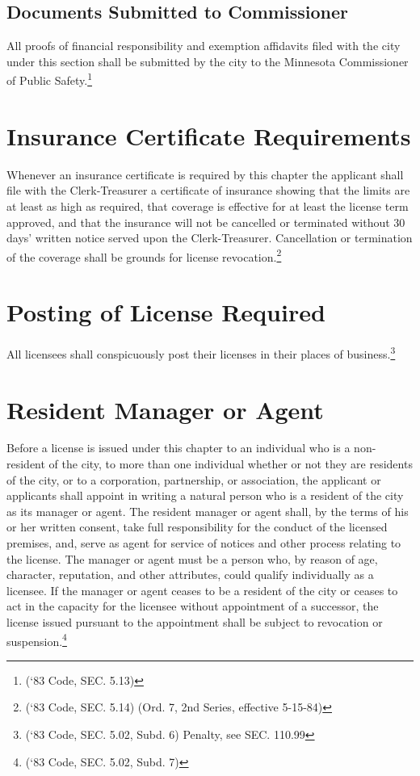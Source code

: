\subsection{Documents Submitted to Commissioner}
All proofs of financial responsibility and exemption affidavits filed with the city under this section shall be submitted by the city to the Minnesota Commissioner of Public Safety.\footnote{(‘83 Code, SEC. 5.13)}

\section{Insurance Certificate Requirements}
Whenever an insurance certificate is required by this chapter the applicant shall file with the Clerk-Treasurer a certificate of insurance showing that the limits are at least as high as required, that coverage is effective for at least the license term approved, and that the insurance will not be cancelled or terminated without 30 days’ written notice served upon the Clerk-Treasurer.  Cancellation or termination of the coverage shall be grounds for license revocation.\footnote{(‘83 Code, SEC. 5.14)  (Ord. 7, 2nd Series, effective 5-15-84)}

\section{Posting of License Required}
All licensees shall conspicuously post their licenses in their places of business.\footnote{(‘83 Code, SEC. 5.02, Subd. 6)  Penalty, see SEC. 110.99}

\section{Resident Manager or Agent}
Before a license is issued under this chapter to an individual who is a non-resident of the city, to more than one individual whether or not they are residents of the city, or to a corporation, partnership, or association, the applicant or applicants shall appoint in writing a natural person who is a resident of the city as its manager or agent.  The resident manager or agent shall, by the terms of his or her written consent, take full responsibility for the conduct of the licensed premises, and, serve as agent for service of notices and other process relating to the license.  The manager or agent must be a person who, by reason of age, character, reputation, and other attributes, could qualify individually as a licensee.  If the manager or agent ceases to be a resident of the city or ceases to act in the capacity for the licensee without appointment of a successor, the license issued pursuant to the appointment shall be subject to revocation or suspension.\footnote{(‘83 Code, SEC. 5.02, Subd. 7)}

